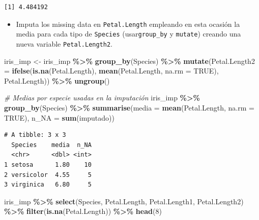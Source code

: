 \documentclass[
]{article}
\newenvironment{Shaded}{\begin{snugshade}}{\end{snugshade}}
\newcommand{\AttributeTok}[1]{\textcolor[rgb]{0.13,0.29,0.53}{#1}}
\newcommand{\CommentTok}[1]{\textcolor[rgb]{0.56,0.35,0.01}{\textit{#1}}}
\newcommand{\ConstantTok}[1]{\textcolor[rgb]{0.56,0.35,0.01}{#1}}
\newcommand{\DecValTok}[1]{\textcolor[rgb]{0.00,0.00,0.81}{#1}}
\newcommand{\FunctionTok}[1]{\textcolor[rgb]{0.13,0.29,0.53}{\textbf{#1}}}
\newcommand{\NormalTok}[1]{#1}
\newcommand{\OtherTok}[1]{\textcolor[rgb]{0.56,0.35,0.01}{#1}}
\newcommand{\SpecialCharTok}[1]{\textcolor[rgb]{0.81,0.36,0.00}{\textbf{#1}}}
\providecommand{\tightlist}{%
  \setlength{\itemsep}{0pt}\setlength{\parskip}{0pt}}
\begin{document}
\begin{verbatim}
[1] 4.484192
\end{verbatim}

\begin{itemize}
\tightlist
\item
  Imputa los missing data en \texttt{Petal.Length} empleando en esta
  ocasión la media para cada tipo de \texttt{Species}
  (usar\texttt{group\_by} y \texttt{mutate}) creando una nueva variable
  \texttt{Petal.Length2}.
\end{itemize}

\begin{Shaded}
\begin{Highlighting}[]
\NormalTok{iris\_imp }\OtherTok{\textless{}{-}}\NormalTok{ iris\_imp }\SpecialCharTok{\%\textgreater{}\%}
  \FunctionTok{group\_by}\NormalTok{(Species) }\SpecialCharTok{\%\textgreater{}\%}
  \FunctionTok{mutate}\NormalTok{(}\AttributeTok{Petal.Length2 =} \FunctionTok{ifelse}\NormalTok{(}\FunctionTok{is.na}\NormalTok{(Petal.Length),}
                                \FunctionTok{mean}\NormalTok{(Petal.Length, }\AttributeTok{na.rm =} \ConstantTok{TRUE}\NormalTok{),}
\NormalTok{                                Petal.Length)) }\SpecialCharTok{\%\textgreater{}\%}
  \FunctionTok{ungroup}\NormalTok{()}

\CommentTok{\# Medias por especie usadas en la imputación}
\NormalTok{iris\_imp }\SpecialCharTok{\%\textgreater{}\%}
  \FunctionTok{group\_by}\NormalTok{(Species) }\SpecialCharTok{\%\textgreater{}\%}
  \FunctionTok{summarise}\NormalTok{(}\AttributeTok{media =} \FunctionTok{mean}\NormalTok{(Petal.Length, }\AttributeTok{na.rm =} \ConstantTok{TRUE}\NormalTok{), }\AttributeTok{n\_NA =} \FunctionTok{sum}\NormalTok{(imputado))}
\end{Highlighting}
\end{Shaded}

\begin{verbatim}
# A tibble: 3 x 3
  Species    media  n_NA
  <chr>      <dbl> <int>
1 setosa      1.80    10
2 versicolor  4.55     5
3 virginica   6.80     5
\end{verbatim}

\begin{Shaded}
\begin{Highlighting}[]
\NormalTok{iris\_imp }\SpecialCharTok{\%\textgreater{}\%} \FunctionTok{select}\NormalTok{(Species, Petal.Length, Petal.Length1, Petal.Length2) }\SpecialCharTok{\%\textgreater{}\%}
  \FunctionTok{filter}\NormalTok{(}\FunctionTok{is.na}\NormalTok{(Petal.Length)) }\SpecialCharTok{\%\textgreater{}\%} \FunctionTok{head}\NormalTok{(}\DecValTok{8}\NormalTok{)}
\end{Highlighting}
\end{Shaded}
\end{document}
